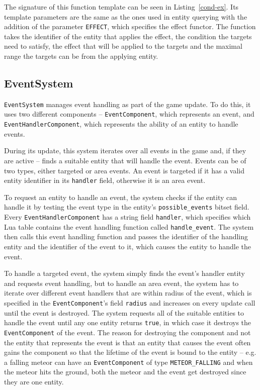 The signature of this function template can be seen in Listing~\ref{cond-ex}. Its template parameters are the same as the ones used
in entity querying with the addition of the parameter \texttt{EFFECT}, which specifies the effect functor. The function takes the
identifier of the entity that applies the effect, the condition the targets need to satisfy, the effect that will be applied to the
targets and the maximal range the targets can be from the applying entity.

\subsection{EventSystem}

\texttt{EventSystem} manages event handling as part of the game update. To do this, it uses two different components --
\texttt{EventComponent}, which represents an event, and \texttt{EventHandlerComponent}, which represents the ability of an entity
to handle events.

During its update, this system iterates over all events in the game and, if they are active -- finds a suitable entity that will
handle the event. Events can be of two types, either targeted or area events. An event is targeted if it has a valid entity
identifier in its \texttt{handler} field, otherwise it is an area event.

To request an entity to handle an event, the system checks if the entity can handle it by testing the event type in the entity's
\texttt{possible\_events} bitset field. Every \texttt{EventHandlerComponent} has a string field \texttt{handler}, which specifies
which Lua table contains the event handling function called \texttt{handle\_event}. The system then calls this event handling
function and passes the identifier of the handling entity and the identifier of the event to it, which causes the entity
to handle the event.

To handle a targeted event, the system simply finds the event's handler entity and requests event handling, but to handle an area event,
the system has to iterate over different event handlers that are within radius of the event, which is specified in the
\texttt{EventComponent}'s field \texttt{radius} and increases on every update call until the event is destroyed. The system requests
all of the suitable entities to handle the event until any one entity returns \texttt{true}, in which case it destroys the
\texttt{EventComponent} of the event. The reason for destroying the component and not the entity that represents the event is that
an entity that causes the event often gains the component so that the lifetime of the event is bound to the entity -- e.g. a falling
meteor can have an \texttt{EventComponent} of type \texttt{METEOR\_FALLING} and when the meteor hits the ground, both the meteor and
the event get destroyed since they are one entity.

